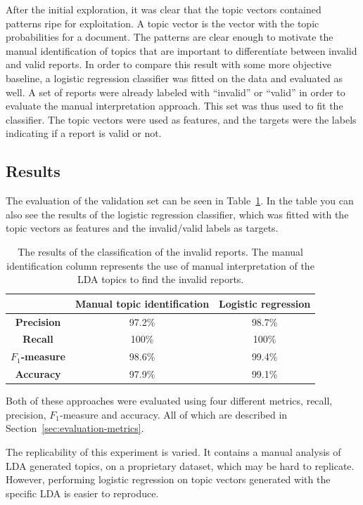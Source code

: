 After the initial exploration, it was clear that the topic vectors contained patterns ripe for exploitation.
A topic vector is the vector with the topic probabilities for a document.
The patterns are clear enough to motivate the manual identification of topics that are important to differentiate between invalid and valid reports.
In order to compare this result with some more objective baseline, a logistic regression classifier was fitted on the data and evaluated as well.
A set of reports were already labeled with ``invalid'' or ``valid'' in order to evaluate the manual interpretation approach.
This set was thus used to fit the classifier.
The topic vectors were used as features, and the targets were the labels indicating if a report is valid or not.

\subsection{Results}

The evaluation of the validation set can be seen in Table~\ref{tab:exp1-eval}.
In the table you can also see the results of the logistic regression classifier, which was fitted with the topic vectors as features and the invalid/valid labels as targets.

\begin{table}[h!]
    \centering
    \begin{tabular}{|c|cc|}
        \hline
        & \textbf{Manual topic identification} & \textbf{Logistic regression} \\
        \hline
        \textbf{Precision} & 97.2\% & 98.7\% \\
        \textbf{Recall} & 100\% & 100\% \\
        \textbf{$F_1$-measure} & 98.6\% & 99.4\%\\
        \textbf{Accuracy} & 97.9\% & 99.1\%\\
        \hline
    \end{tabular}
    \caption{The results of the classification of the invalid reports. The manual identification column represents the use of manual interpretation of the LDA topics to find the invalid reports.}
    \label{tab:exp1-eval}
\end{table}

Both of these approaches were evaluated using four different metrics, recall, precision, $F_1$-measure and accuracy.
All of which are described in Section~\ref{sec:evaluation-metrics}.

The replicability of this experiment is varied.
It contains a manual analysis of LDA generated topics, on a proprietary dataset, which may be hard to replicate.
However, performing logistic regression on topic vectors generated with the specific LDA is easier to reproduce.

